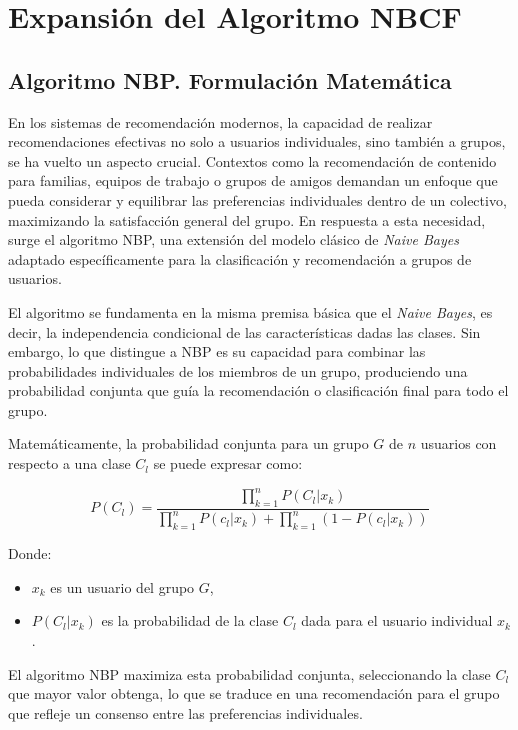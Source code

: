 \documentclass[runningheads,a4paper]{llncs}
\begin{document}
\section{Expansión del Algoritmo NBCF}

\subsection{Algoritmo NBP. Formulación Matemática}
En los sistemas de recomendación modernos, la 
capacidad de realizar recomendaciones efectivas 
no solo a usuarios individuales, sino también a grupos, 
se ha vuelto un aspecto crucial. Contextos como la 
recomendación de contenido para familias, equipos de 
trabajo o grupos de amigos demandan un enfoque que 
pueda considerar y equilibrar las preferencias 
individuales dentro de un colectivo, maximizando la 
satisfacción general del grupo. En respuesta a esta 
necesidad, surge el algoritmo NBP, una extensión del 
modelo clásico de \textit{Naive Bayes} adaptado 
específicamente para la clasificación y recomendación 
a grupos de usuarios.

El algoritmo se fundamenta en la misma premisa básica 
que el \textit{Naive Bayes}, es decir, la independencia 
condicional de las características dadas las clases. 
Sin embargo, lo que distingue a NBP es su capacidad 
para combinar las probabilidades individuales de los 
miembros de un grupo, produciendo una probabilidad 
conjunta que guía la recomendación o clasificación 
final para todo el grupo.

Matemáticamente, la probabilidad conjunta para un 
grupo $G$ de $n$ usuarios con respecto a una clase $C_l$ 
se puede expresar como:

\begin{equation}
    P(C_l) = \frac{\prod_{k=1}^{n} P(C_l|x_k)}{\prod_{k=1}^{n} P(c_l|x_k) + \prod_{k=1}^{n} (1-P(c_l|x_k))}
\end{equation} \cite{nbp}

Donde:
\begin{itemize}
    \item $x_k$ es un usuario del grupo $G$,
    \item $P(C_l|x_k)$ es la probabilidad de la 
    clase $C_l$ dada para el usuario individual $x_k$. 
\end{itemize} 

El algoritmo NBP maximiza esta probabilidad conjunta, 
seleccionando la clase $C_l$ que mayor valor obtenga, 
lo que se traduce en una recomendación para el grupo 
que refleje un consenso entre las preferencias 
individuales.
\end{document}
